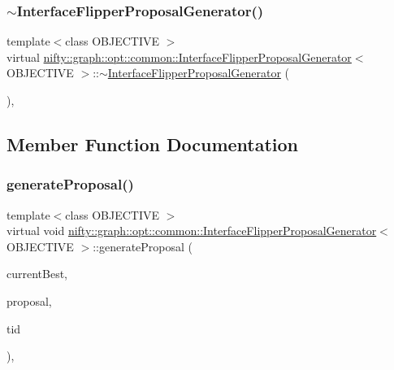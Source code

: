 \subsubsection{\texorpdfstring{$\sim$\+Interface\+Flipper\+Proposal\+Generator()}{~InterfaceFlipperProposalGenerator()}}
{\footnotesize\ttfamily template$<$class O\+B\+J\+E\+C\+T\+I\+VE $>$ \\
virtual \hyperlink{classnifty_1_1graph_1_1opt_1_1common_1_1InterfaceFlipperProposalGenerator}{nifty\+::graph\+::opt\+::common\+::\+Interface\+Flipper\+Proposal\+Generator}$<$ O\+B\+J\+E\+C\+T\+I\+VE $>$\+::$\sim$\hyperlink{classnifty_1_1graph_1_1opt_1_1common_1_1InterfaceFlipperProposalGenerator}{Interface\+Flipper\+Proposal\+Generator} (\begin{DoxyParamCaption}{ }\end{DoxyParamCaption})\hspace{0.3cm}{\ttfamily [inline]}, {\ttfamily [virtual]}}



\subsection{Member Function Documentation}
\mbox{\label{classnifty_1_1graph_1_1opt_1_1common_1_1InterfaceFlipperProposalGenerator_acbd07354ba5ba08aa91fbce29c465776}} 
\subsubsection{\texorpdfstring{generate\+Proposal()}{generateProposal()}}
{\footnotesize\ttfamily template$<$class O\+B\+J\+E\+C\+T\+I\+VE $>$ \\
virtual void \hyperlink{classnifty_1_1graph_1_1opt_1_1common_1_1InterfaceFlipperProposalGenerator}{nifty\+::graph\+::opt\+::common\+::\+Interface\+Flipper\+Proposal\+Generator}$<$ O\+B\+J\+E\+C\+T\+I\+VE $>$\+::generate\+Proposal (\begin{DoxyParamCaption}\item[{const \hyperlink{classnifty_1_1graph_1_1opt_1_1common_1_1InterfaceFlipperProposalGenerator_aced6351cf8e65e436e1efedd8f5ed089}{Proposal\+Type} \&}]{current\+Best,  }\item[{\hyperlink{classnifty_1_1graph_1_1opt_1_1common_1_1InterfaceFlipperProposalGenerator_aced6351cf8e65e436e1efedd8f5ed089}{Proposal\+Type} \&}]{proposal,  }\item[{const size\+\_\+t}]{tid }\end{DoxyParamCaption})\hspace{0.3cm}{\ttfamily [inline]}, {\ttfamily [virtual]}}


